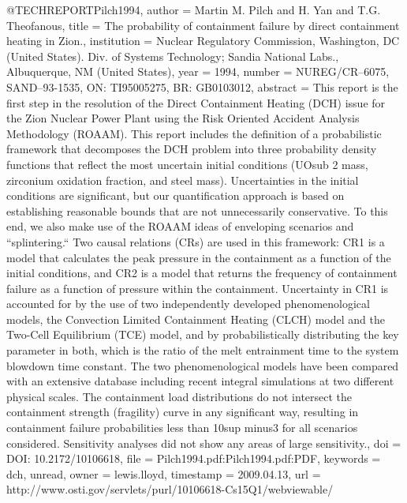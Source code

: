 {{@TECHREPORT{Pilch1994,
  author = {Martin M. Pilch and H. Yan and T.G. Theofanous},
  title = {The probability of containment failure by direct containment heating
	in Zion.},
  institution = {Nuclear Regulatory Commission, Washington, DC (United States). Div.
	of Systems Technology; Sandia National Labs., Albuquerque, NM (United
	States)},
  year = {1994},
  number = {NUREG/CR--6075, SAND--93-1535, ON: TI95005275, BR: GB0103012},
  abstract = {This report is the first step in the resolution of the Direct Containment
	Heating (DCH) issue for the Zion Nuclear Power Plant using the Risk
	Oriented Accident Analysis Methodology (ROAAM). This report includes
	the definition of a probabilistic framework that decomposes the DCH
	problem into three probability density functions that reflect the
	most uncertain initial conditions (UO{sub 2} mass, zirconium oxidation
	fraction, and steel mass). Uncertainties in the initial conditions
	are significant, but our quantification approach is based on establishing
	reasonable bounds that are not unnecessarily conservative. To this
	end, we also make use of the ROAAM ideas of enveloping scenarios
	and ``splintering.`` Two causal relations (CRs) are used in this
	framework: CR1 is a model that calculates the peak pressure in the
	containment as a function of the initial conditions, and CR2 is a
	model that returns the frequency of containment failure as a function
	of pressure within the containment. Uncertainty in CR1 is accounted
	for by the use of two independently developed phenomenological models,
	the Convection Limited Containment Heating (CLCH) model and the Two-Cell
	Equilibrium (TCE) model, and by probabilistically distributing the
	key parameter in both, which is the ratio of the melt entrainment
	time to the system blowdown time constant. The two phenomenological
	models have been compared with an extensive database including recent
	integral simulations at two different physical scales. The containment
	load distributions do not intersect the containment strength (fragility)
	curve in any significant way, resulting in containment failure probabilities
	less than 10{sup {minus}3} for all scenarios considered. Sensitivity
	analyses did not show any areas of large sensitivity.},
  doi = {DOI: 10.2172/10106618},
  file = {Pilch1994.pdf:Pilch1994.pdf:PDF},
  keywords = {dch, unread},
  owner = {lewis.lloyd},
  timestamp = {2009.04.13},
  url = {http://www.osti.gov/servlets/purl/10106618-Cs15Q1/webviewable/}
}

}}

